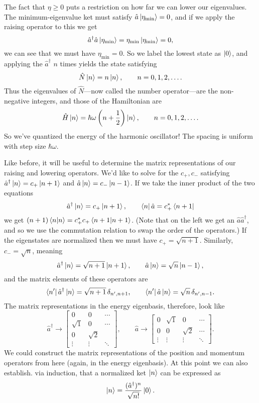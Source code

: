 \documentclass[../p116main.tex]{subfiles}
\begin{document}
The fact that $\eta \geq 0$ puts a restriction on how far we can lower our eigenvalues.
The minimum-eigenvalue ket must satisfy $\hat a \left| \eta_\textrm{min} \right> = 0$, and if we apply the raising operator to this we get
\[ \hat a^\dagger \hat a \left| \eta_\textrm{min} \right> = \eta_\textrm{min} \left| \eta_\textrm{min} \right> = 0, \]
we can see that we must have $\eta_\textrm{min} = 0$.
So we label the lowest state as $\left| 0 \right>$, and applying the $\hat a^\dagger$ $n$ times yields the state satisfying
\[ \hat N \left| n \right> = n \left| n \right>, \qquad n = 0, 1, 2, \ldots. \]
Thus the eigenvalues of $\hat N$---now called the number operator---are the non-negative integers, and those of the Hamiltonian are
\[ \hat H \left| n \right> = \hbar \omega \left( n + \frac{1}{2} \right) \left| n \right>, \qquad n = 0, 1, 2, \ldots. \]
So we've quantized the energy of the harmonic oscillator!
The spacing is uniform with step size $\hbar \omega$.

Like before, it will be useful to determine the matrix representations of our raising and lowering operators.
We'd like to solve for the $c_+, c_-$ satisfying $\hat a^\dagger \left| n \right> = c_+ \left| n+1 \right>$ and $\hat a \left| n \right> = c_- \left| n-1 \right>$.
If we take the inner product of the two equations
\[ \hat a^\dagger \left| n \right> = c_+ \left| n+1 \right>, \qquad \left< n \right| \hat a = c_+^* \left< n+1 \right| \]
we get $(n+1) \left< n \middle| n \right> = c_+^* c_+ \left< n+1 \middle| n+1 \right>$.
(Note that on the left we get an $\hat a \hat a^\dagger$, and so we use the commutation relation to swap the order of the operators.)
If the eigenstates are normalized then we must have $c_+ = \sqrt{n+1}$.
Similarly, $c_- = \sqrt{n}$, meaning
\[ \hat a^\dagger \left| n \right> = \sqrt{n+1} \left| n+1 \right>, \qquad \hat a \left| n \right> = \sqrt{n} \left| n-1 \right>, \]
and the matrix elements of these operators are
\[ \left< n' \right| \hat a^\dagger \left| n \right> = \sqrt{n+1} \,\delta_{n', n+1}, \qquad \left< n' \right| \hat a \left| n \right> = \sqrt{n} \, \delta_{n', n-1}. \]
The matrix representations in the energy eigenbasis, therefore, look like
\[ \hat a^\dagger \rightarrow \begin{bmatrix} 0 & 0 & \cdots \\ \sqrt{1} & 0 & \cdots \\ 0 & \sqrt{2} \\ \vdots & \vdots & \ddots \end{bmatrix}, \qquad \hat a \rightarrow \begin{bmatrix} 0 & \sqrt{1} & 0 & \cdots \\ 0 & 0 & \sqrt{2} & \cdots \\ \vdots & \vdots & \vdots & \ddots \end{bmatrix}. \]
We could construct the matrix representations of the position and momentum operators from here (again, in the energy eigenbasis).
At this point we can also establish. via induction, that a normalized ket $\left| n \right>$ can be expressed as
\[ \left| n \right> = \frac{(\hat a^\dagger)^n}{\sqrt{n!}} \left| 0 \right>. \]
\end{document}
